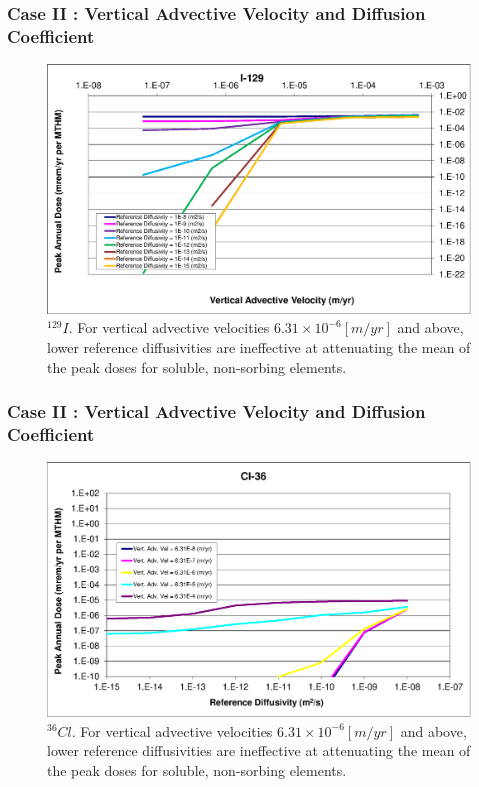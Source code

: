 \begin{frame}[c]
  \frametitle{Case II : Vertical Advective Velocity and Diffusion Coefficient}

\begin{figure}[ht!]
\centering
\includegraphics[width=\linewidth]{AdvVelAndDiffCoeffEBSFail/I-129-VAdvVel.eps}
\caption{$^{129}I$.
For vertical advective velocities 
$6.31\times10^{-6}[m/yr]$ and above, lower reference diffusivities are 
ineffective at attenuating the mean of the peak doses for soluble, non-sorbing 
elements. 
}
\label{fig:VAdvVelI129VAdvVel}
\end{figure}
\end{frame}


\begin{frame}[c]
  \frametitle{Case II : Vertical Advective Velocity and Diffusion Coefficient}

\begin{figure}[htp!]
\centering
\includegraphics[width=\textwidth]{AdvVelAndDiffCoeffEBSFail/Cl-36.eps}
\caption{$^{36}Cl$.
For vertical advective velocities 
$6.31\times10^{-6}[m/yr]$ and above, lower reference diffusivities are 
ineffective at attenuating the mean of the peak doses for soluble, non-sorbing 
elements. 
}
\label{fig:VAdvVelCl36}
\end{figure}
\end{frame}


